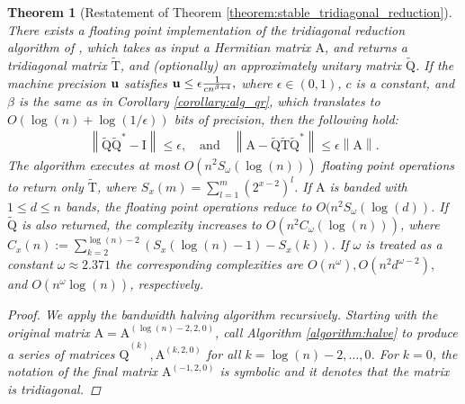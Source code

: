 \documentclass{article}
\newcommand{\lnorm}{\left\|}
\newcommand{\rnorm}{\right\|}
\newcommand{\lpar}{\left(}
\newcommand{\rpar}{\right)}
\newtheorem{theorem}{Theorem}[section]
\newcommand\matA{\boldsymbol{\mathrm{A}}}
\newcommand\matI{\boldsymbol{\mathrm{I}}}
\newcommand\matQtilde{\widetilde{\boldsymbol{\mathrm{Q}}}}
\newcommand\matTtilde{\widetilde{\boldsymbol{\mathrm{T}}}}
\newcommand\matQhat{\widehat{\boldsymbol{\mathrm{Q}}}}
\newcommand{\umach}{\textbf{\textup{u}}}
\newcommand{\cmm}{\beta}
\begin{document}
\begin{theorem}[Restatement of Theorem \ref{theorem:stable_tridiagonal_reduction}]
    \label{theorem:stable_tridiagonal_reduction_appendix}
    There exists a floating point implementation of the tridiagonal reduction algorithm of \cite{schonhage1972unitare}, which takes as input a Hermitian matrix $\matA$, and returns a tridiagonal matrix $\matTtilde$, and (optionally) an approximately unitary matrix $\matQtilde$. If the machine precision $\umach$ satisfies
    $
        \umach \leq \epsilon\frac{1}{cn^{\beta+4}},
    $
    where $\epsilon\in(0,1)$, $c$ is a constant, and $\cmm$ is the same as in Corollary \ref{corollary:alg_qr}, which translates to $O(\log(n)+\log(1/\epsilon))$ bits of precision, then the following hold:
    \begin{align*}
        \lnorm \matQtilde\matQtilde^*-\matI\rnorm \leq \epsilon,
        \quad
        \text{and}
        \quad
        \lnorm \matA - \matQtilde\matTtilde\matQtilde^* \rnorm \leq \epsilon \lnorm \matA \rnorm.
    \end{align*}
    The algorithm executes at most $O\lpar
                    n^2 S_{\omega}(\log(n))
    \rpar$ floating point operations to return only $\matTtilde$, where $S_x(m)=\sum_{l=1}^m (2^{x-2})^l$.
    If $\matA$ is banded with $1\leq d\leq n$ bands, the floating point operations reduce to $O(n^2 S_{\omega}(\log(d))$.
    If $\matQtilde$ is also returned, the complexity increases to $O(n^2C_{\omega}(\log(n)))$, 
    where $C_{x}(n) := 
    \sum_{k=2}^{\log(n)-2}
    \lpar
        S_{x}(\log(n)-1) - S_{x}(k)
    \rpar$. If $\omega$ is treated as a constant $\omega\approx 2.371$ the corresponding complexities are $O(n^{\omega}), O(n^2d^{\omega-2}),$ and $O(n^{\omega}\log(n))$, respectively.
    \begin{proof}
        We apply the bandwidth halving algorithm recursively. Starting with the original matrix $\matA=\matA^{(\log(n)-2,2,0)}$, call Algorithm \ref{algorithm:halve} to produce a series of matrices $\matQhat^{(k)},\matA^{(k,2,0)}$ for all $k=\log(n)-2,\ldots,0$. For $k=0$, the notation of the final matrix $\matA^{(-1,2,0)}$ is symbolic and it denotes that the matrix is tridiagonal.


\end{proof}
\end{theorem}
\end{document}
